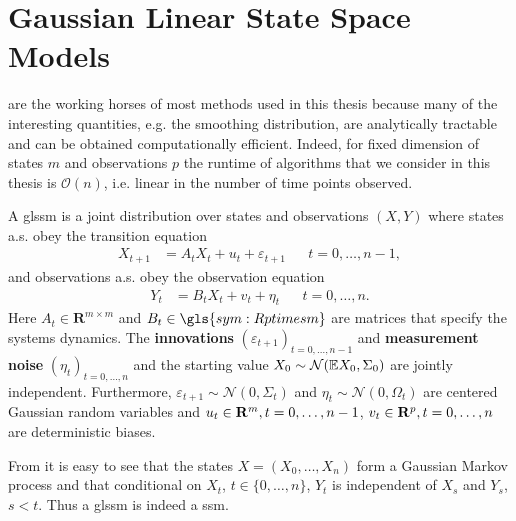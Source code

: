 \section{Gaussian Linear State Space Models}
\label{sec:linear_gaussian_state_space_models}

 are the working horses of most methods used in this thesis because many of the interesting quantities, e.g. the smoothing distribution, are analytically tractable and can be obtained computationally efficient. Indeed, for fixed dimension of states $m$ and observations $p$ the runtime of algorithms that we consider in this thesis is $\mathcal O(n)$, i.e. linear in the number of time points observed. 

\begin{definition}
    \label{def:glssm}
    A \acrfull{glssm} is a joint distribution over states and observations $(X,Y)$ where states a.s. obey the transition equation
    \begin{align}
        \label{eq:glssm_states}
        X_{t + 1} & = A_{t}X_{t} + u_{t} + \varepsilon_{t + 1} &  & t = 0, \dots, n - 1,
    \end{align}
    and observations a.s. obey the observation equation
    \begin{align}
        \label{eq:glssm_observations}
        Y_{t} & = B_{t}X_{t} + v_{t} + \eta_{t} &  & t = 0, \dots, n.
    \end{align}
    Here $A_{t} \in \mathbf{R}^{m \times m}$ and $B_{t} \in \gls{sym:Rptimesm}$ are matrices that specify the systems dynamics. The \textbf{innovations} $(\varepsilon_{t + 1})_{t = 0, \dots, n-1}$ and \textbf{measurement noise} $(\eta_{t})_{t = 0, \dots, n}$ and the  starting value $X_{0} \sim \mathcal N (\mathbb E X_{0}, \Sigma_{0})$ are jointly independent. Furthermore, $\varepsilon_{t+1} \sim \mathcal N(0, \Sigma_{t})$ and $\eta_{t}\sim \mathcal N(0, \Omega_{t})$ are centered Gaussian random variables and $u_{t} \in \mathbf R^{m}, t = 0, \dots, n - 1$, $v_{t} \in \mathbf R^{p}, t = 0, \dots, n$ are deterministic biases.
\end{definition}

\begin{remark}
    From  it is easy to see that the states $X = (X_{0}, \dots, X_{n})$ form a Gaussian Markov process and that conditional on $X_{t}$, $t \in \{0, \dots, n\}$, $Y_{t}$ is independent of $X_{s}$ and $Y_{s}$, $s < t$. Thus a \acrshort{glssm} is indeed a \acrshort{ssm}.
\end{remark}


